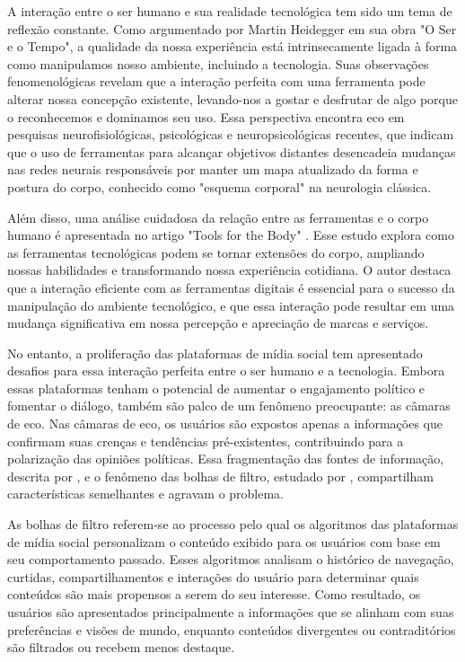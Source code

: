 A interação entre o ser humano e sua realidade tecnológica tem sido um tema de reflexão constante. Como argumentado por Martin Heidegger em sua obra "O Ser e o Tempo", a qualidade da nossa experiência está intrinsecamente ligada à forma como manipulamos nosso ambiente, incluindo a tecnologia. Suas observações fenomenológicas revelam que a interação perfeita com uma ferramenta pode alterar nossa concepção existente, levando-nos a gostar e desfrutar de algo porque o reconhecemos e dominamos seu uso. Essa perspectiva encontra eco em pesquisas neurofisiológicas, psicológicas e neuropsicológicas recentes, que indicam que o uso de ferramentas para alcançar objetivos distantes desencadeia mudanças nas redes neurais responsáveis por manter um mapa atualizado da forma e postura do corpo, conhecido como "esquema corporal" na neurologia clássica.

Além disso, uma análise cuidadosa da relação entre as ferramentas e o corpo humano é apresentada no artigo "Tools for the Body" \cite[1]{2004_Maravita}. Esse estudo explora como as ferramentas tecnológicas podem se tornar extensões do corpo, ampliando nossas habilidades e transformando nossa experiência cotidiana. O autor destaca que a interação eficiente com as ferramentas digitais é essencial para o sucesso da manipulação do ambiente tecnológico, e que essa interação pode resultar em uma mudança significativa em nossa percepção e apreciação de marcas e serviços.

No entanto, a proliferação das plataformas de mídia social tem apresentado desafios para essa interação perfeita entre o ser humano e a tecnologia. Embora essas plataformas tenham o potencial de aumentar o engajamento político e fomentar o diálogo, também são palco de um fenômeno preocupante: as câmaras de eco. Nas câmaras de eco, os usuários são expostos apenas a informações que confirmam suas crenças e tendências pré-existentes, contribuindo para a polarização das opiniões políticas. Essa fragmentação das fontes de informação, descrita por , e o fenômeno das bolhas de filtro, estudado por , compartilham características semelhantes e agravam o problema.

As bolhas de filtro referem-se ao processo pelo qual os algoritmos das plataformas de mídia social personalizam o conteúdo exibido para os usuários com base em seu comportamento passado. Esses algoritmos analisam o histórico de navegação, curtidas, compartilhamentos e interações do usuário para determinar quais conteúdos são mais propensos a serem do seu interesse. Como resultado, os usuários são apresentados principalmente a informações que se alinham com suas preferências e visões de mundo, enquanto conteúdos divergentes ou contraditórios são filtrados ou recebem menos destaque.

